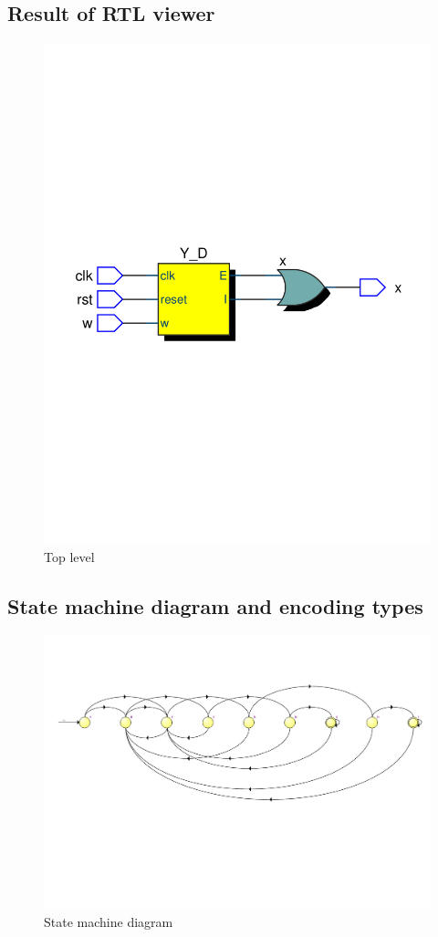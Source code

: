 \documentclass[13pt,a4paper]{report}
\begin{document}
\subsection{Result of RTL viewer}
\begin{figure}[H]
\centering
\includegraphics[scale=0.55, clip, trim={0cm 11cm 0cm 11cm}]{images/Exc2_RTL.pdf}
\caption*{Top level}
\end{figure}

\subsection{State machine diagram and encoding types}
\begin{figure}[H]
\centering
\includegraphics[scale=0.6, clip, trim={0cm 7.3cm 0cm 3.8cm}]{images/Exc2_FSM.pdf}
\caption*{State machine diagram}
\end{figure}
\end{document}
